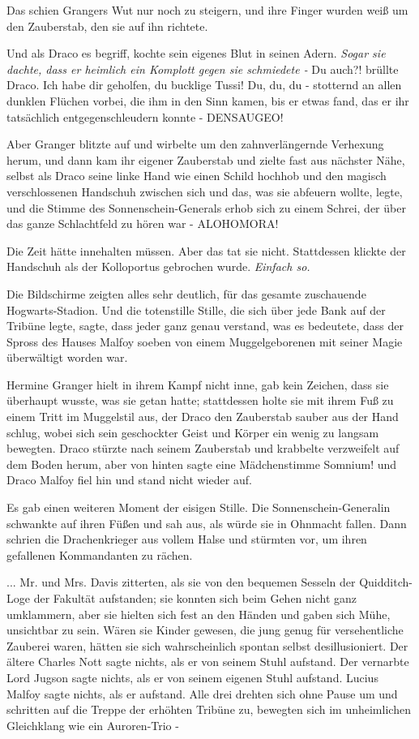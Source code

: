 Das schien Grangers Wut nur noch zu steigern, und ihre Finger wurden weiß um den
Zauberstab, den sie auf ihn richtete.

Und als Draco es begriff, kochte sein eigenes Blut in seinen Adern. \emph{Sogar
sie dachte, dass er heimlich ein Komplott gegen sie schmiedete -} \glqq{}Du
auch?!\grqq{} brüllte Draco. \glqq{}Ich habe dir geholfen, du bucklige Tussi! Du,
du, du\grqq{} - stotternd an allen dunklen Flüchen vorbei, die ihm in den Sinn
kamen, bis er etwas fand, das er ihr tatsächlich entgegenschleudern konnte -
\glqq{}DENSAUGEO!\grqq{}

Aber Granger blitzte auf und wirbelte um den zahnverlängernde Verhexung herum,
und dann kam ihr eigener Zauberstab und zielte fast aus nächster Nähe, selbst
als Draco seine linke Hand wie einen Schild hochhob und den magisch
verschlossenen Handschuh zwischen sich und das, was sie abfeuern wollte, legte,
und die Stimme des Sonnenschein-Generals erhob sich zu einem Schrei, der über
das ganze Schlachtfeld zu hören war - \glqq{}ALOHOMORA!\grqq{}

Die Zeit hätte innehalten müssen. Aber das tat sie nicht. Stattdessen klickte
der Handschuh als der Kolloportus gebrochen wurde.
\emph{Einfach so.}

Die Bildschirme zeigten alles sehr deutlich, für das gesamte zuschauende
Hogwarts-Stadion. Und die totenstille Stille, die sich über jede Bank auf der
Tribüne legte, sagte, dass jeder ganz genau verstand, was es bedeutete, dass der
Spross des Hauses Malfoy soeben von einem Muggelgeborenen mit seiner Magie
überwältigt worden war.

Hermine Granger hielt in ihrem Kampf nicht inne, gab kein Zeichen, dass sie
überhaupt wusste, was sie getan hatte; stattdessen holte sie mit ihrem Fuß zu
einem Tritt im Muggelstil aus, der Draco den Zauberstab sauber aus der Hand
schlug, wobei sich sein geschockter Geist und Körper ein wenig zu langsam
bewegten. Draco stürzte nach seinem Zauberstab und krabbelte verzweifelt auf dem
Boden herum, aber von hinten sagte eine Mädchenstimme \glqq{}Somnium!\grqq{} und
Draco Malfoy fiel hin und stand nicht wieder auf.

Es gab einen weiteren Moment der eisigen Stille. Die Sonnenschein-Generalin
schwankte auf ihren Füßen und sah aus, als würde sie in Ohnmacht fallen. Dann
schrien die Drachenkrieger aus vollem Halse und stürmten vor, um ihren
gefallenen Kommandanten zu rächen.

... Mr. und Mrs. Davis zitterten, als sie von den bequemen Sesseln der
Quidditch-Loge der Fakultät aufstanden; sie konnten sich beim Gehen nicht ganz
umklammern, aber sie hielten sich fest an den Händen und gaben sich Mühe,
unsichtbar zu sein. Wären sie Kinder gewesen, die jung genug für versehentliche
Zauberei waren, hätten sie sich wahrscheinlich spontan selbst desillusioniert.
Der ältere Charles Nott sagte nichts, als er von seinem Stuhl aufstand. Der
vernarbte Lord Jugson sagte nichts, als er von seinem eigenen Stuhl aufstand.
Lucius Malfoy sagte nichts, als er aufstand. Alle drei drehten sich ohne Pause
um und schritten auf die Treppe der erhöhten Tribüne zu, bewegten sich im
unheimlichen Gleichklang wie ein Auroren-Trio -

